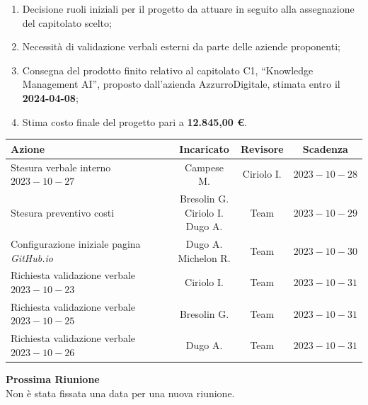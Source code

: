 \documentclass{article}
\makeatletter
\newcommand{\quantities}[1]{%
  \begin{tabular}{@{}c@{}}\strut#1\strut\end{tabular}%
}
\makeatother
\begin{document}
\begin{paracol}{2}
\vspace{7em}

\begin{enumerate}
    \item Decisione ruoli iniziali per il progetto da attuare in seguito alla assegnazione del capitolato scelto;   
    \item Necessità di validazione verbali esterni da parte delle aziende proponenti;
    \item Consegna del prodotto finito relativo al capitolato C1, “Knowledge
Management AI”, proposto dall’azienda AzzurroDigitale, stimata entro il \textbf{2024-04-08};
\item Stima costo finale del progetto pari a \textbf{12.845,00 €}.
    
\end{enumerate}

\end{paracol}

\newpage


{\renewcommand{\arraystretch}{1.5}
\begin{tabularx}{\textwidth}{X|c|c|c}
\textbf{Azione} & \textbf{Incaricato} & \textbf{Revisore} & \textbf{Scadenza} \\
\hline
Stesura verbale interno $2023-10-27$ & Campese M. & Ciriolo I. & $2023-10-28$ \\
\hline
Stesura preventivo costi  & \quantities{Bresolin G. \\ Ciriolo I.\\ Dugo A.} & Team & $2023-10-29$ \\
\hline
Configurazione iniziale pagina \textit{GitHub.io} & \quantities{Dugo A. \\ Michelon R.} & Team & $2023-10-30$ \\
\hline
Richiesta validazione verbale $2023-10-23$ & Ciriolo I. & Team & $2023-10-31$ \\
\hline
Richiesta validazione verbale $2023-10-25$ & Bresolin G. & Team & $2023-10-31$ \\
\hline
Richiesta validazione verbale $2023-10-26$ & Dugo A. & Team & $2023-10-31$ \\

\end{tabularx}}

\vspace{3em}


\textbf{Prossima Riunione}\\
Non è stata fissata una data per una nuova riunione.
\end{document}
